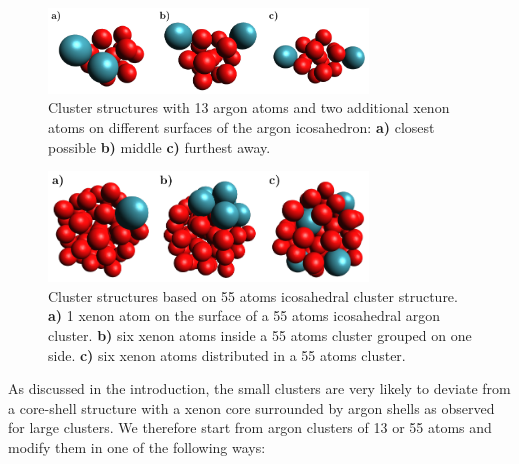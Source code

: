 \begin{figure}[ht]
 \centering
 \includegraphics[width=8.5cm]{pics/cluster_2_overview.pdf}
 \caption{Cluster structures with 13 argon atoms and two additional xenon
          atoms on different surfaces of the argon icosahedron:
          \textbf{a)} closest possible \textbf{b)} middle \textbf{c)}
          furthest away.}
 \label{figure:cluster_2_overview}
\end{figure}

\begin{figure}[h]
 \centering
 \includegraphics[width=8.5cm]{pics/cluster_3_overview.pdf}
 \caption{Cluster structures based on 55 atoms icosahedral cluster structure.
          \textbf{a)} 1 xenon atom on the surface of a 55 atoms icosahedral
          argon cluster. \textbf{b)} six xenon atoms inside a 55 atoms cluster
          grouped on one side. \textbf{c)} six xenon atoms distributed
          in a 55 atoms cluster. }
 \label{figure:cluster_3_overview}
\end{figure}

As discussed in the introduction, the small clusters are very likely
to deviate from a core-shell structure with a xenon core surrounded
by argon shells as observed for large clusters. We therefore start from
argon clusters of 13 or 55 atoms and modify them in one of the following
ways:

